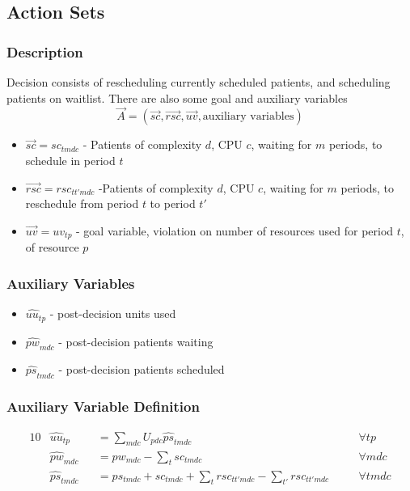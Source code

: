 \documentclass{article}
\begin{document}
\subsection{Action Sets}
\subsubsection{Description}
Decision consists of rescheduling currently scheduled patients, and scheduling patients on waitlist. There are also some goal and auxiliary variables
\[  \vec{A} = (\vec{sc}, \vec{rsc}, \vec{uv}, \text{auxiliary variables}) \] 
\begin{itemize}
    \item $\vec{sc} = sc_{tmdc}$ - Patients of complexity $d$, CPU $c$, waiting for $m$ periods, to schedule in period $t$
	\item $\vec{rsc} = rsc_{tt'mdc}$ -Patients of complexity $d$, CPU $c$, waiting for $m$ periods, to reschedule from period $t$ to period $t'$
	\item $\vec{uv} = uv_{tp}$ - goal variable, violation on number of resources used for period $t$, of resource $p$
\end{itemize}

\subsubsection{Auxiliary Variables}
\begin{itemize}
	\item $\hat{uu}_{tp}$ - post-decision units used
	\item $\hat{pw}_{mdc}$ - post-decision patients waiting
	\item $\hat{ps}_{tmdc}$ - post-decision patients scheduled
\end{itemize}
\subsubsection{Auxiliary Variable Definition}
\label{auxiliary constraints}
\begin{alignat}{10}
	& \hat{uu}_{tp} 
		&& =  \sum_{mdc} U_{pdc} \hat{ps}_{tmdc} \quad
		&& \forall tp \\ 
	& \hat{pw}_{mdc} 
		&& = pw_{mdc} - \sum_{t} sc_{tmdc} \quad 
		&& \forall mdc \\ 
	& \hat{ps}_{tmdc} 
		&& = ps_{tmdc} + sc_{tmdc} + 
			\sum_{t} rsc_{tt'mdc} - \sum_{t'} rsc_{tt'mdc} \quad 
		&& \forall tmdc
\end{alignat}
\end{document}
